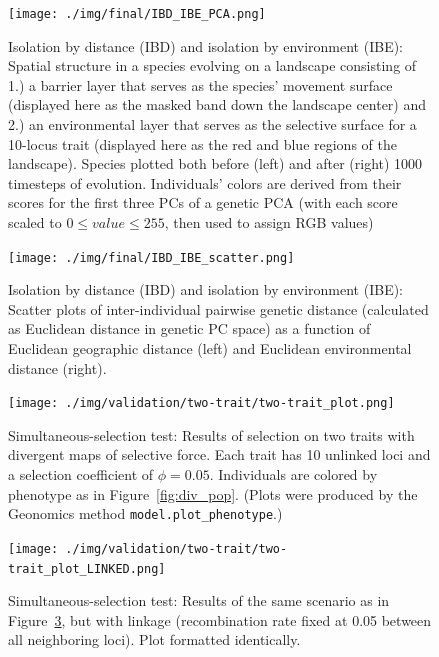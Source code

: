 ﻿\documentclass{article}
\begin{document}
\begin{figure}[ht!]
        \texttt{[image: ./img/final/IBD\_IBE\_PCA.png]}
        \caption{Isolation by distance (IBD) and isolation by environment (IBE):
                 Spatial structure in a species evolving on a
                 landscape consisting of 1.) a barrier layer
                 that serves as the species' movement surface
                 (displayed here as the masked band down the landscape center)
                 and 2.) an environmental layer that serves as
                 the selective surface for a 10-locus trait
                 (displayed here as the red and blue regions of the landscape).
                 Species plotted both before (left)
                 and after (right) 1000 timesteps of evolution.
                 Individuals' colors are derived from their scores
                 for the first three PCs of a genetic PCA
                 (with each score scaled to $0\leq value\leq255$,
                 then used to assign RGB values)}
        \label{fig:IBD_IBE_PCA}
\end{figure}



\begin{figure}[ht!]
        \texttt{[image: ./img/final/IBD\_IBE\_scatter.png]}
        \caption{Isolation by distance (IBD) and isolation by environment (IBE):
                 Scatter plots of inter-individual pairwise genetic distance
                 (calculated as Euclidean distance in genetic PC space)
                 as a function of Euclidean geographic distance (left)
                 and Euclidean environmental distance (right).}
        \label{fig:IBD_IBE_scatter}
\end{figure}



\begin{figure}[ht!]
        \texttt{[image: ./img/validation/two-trait/two-trait\_plot.png]}
        \caption{Simultaneous-selection test: Results of selection
                 on two traits with divergent maps of selective force.
                 Each trait has 10 unlinked loci
                 and a selection coefficient of $\phi = 0.05$.
                 Individuals are colored by phenotype as in Figure~\ref{fig:div_pop}.
                 (Plots were produced by the Geonomics method
                 \texttt{model.plot\_phenotype}.)}
        \label{fig:two_trait_unlinked}
\end{figure}


\begin{figure}[ht!]
        \texttt{[image: ./img/validation/two-trait/two-trait\_plot\_LINKED.png]}
         \caption{Simultaneous-selection test: Results of the same
                 scenario as in Figure~\ref{fig:two_trait_unlinked},
                 but with linkage (recombination rate fixed at 0.05
                 between all neighboring loci).
                 Plot formatted identically.}
        \label{fig:two_trait_linked}
\end{figure}
\end{document}
